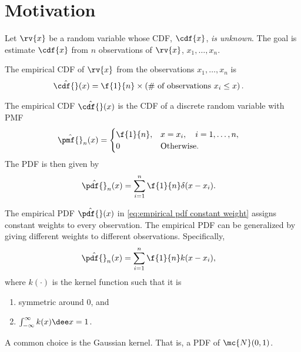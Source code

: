 \section{Motivation}
Let $\rv{x}$ be a random variable whose CDF, $\cdf{x}$, \emph{is unknown}. The goal is estimate $\cdf{x}$ from $n$ observations of $\rv{x}$, $x_{1}, \ldots, x_{n}$.

\begin{definitionBox}
    The empirical CDF of $\rv{x}$ from the observations $x_{1}, \ldots, x_{n}$ is
    \begin{align}
        \hat{\cdf{}}(x) &= \f{1}{n} \times \left( \# \text{ of observations } x_{i} \leq x \right).
    \end{align}
\end{definitionBox}
The empirical CDF $\hat{\cdf{}}(x)$ is the CDF of a discrete random variable with PMF
\begin{align}
    \hat{\pmf{}}_{n}(x) &= 
    \begin{cases}
        \f{1}{n}, & x = x_{i}, \quad i = 1,\ldots, n,\\
        0 & \text{Otherwise}.
    \end{cases}
\end{align}
The PDF is then given by
\begin{align}
    \label{eq:empirical pdf constant weight}
    \hat{\pdf{}}_{n}(x) &= \sum_{i=1}^{n}\f{1}{n}\delta(x-x_{i}).
\end{align}

The empirical PDF $\hat{\pdf{}}(x)$ in \eqref{eq:empirical pdf constant weight} assigns constant weights to every observation. The empirical PDF can be generalized by giving different weights to different observations. Specifically,
\begin{align}
    \hat{\pdf{}}_{n}(x) &= \sum_{i=1}^{n}\f{1}{n}k(x-x_{i}),
\end{align}
where $k(\cdot)$ is the kernel function such that it is
\begin{enumerate}
    \item symmetric around 0, and
    \item $\int_{-\infty}^{\infty}k(x)\dee x = 1$.
\end{enumerate}
A common choice is the Gaussian kernel. That is, a PDF of $\mc{N}(0,1)$.



